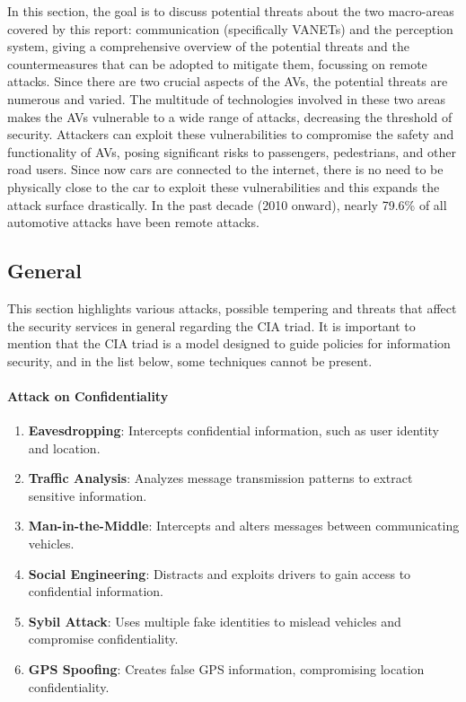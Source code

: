In this section, the goal is to discuss potential threats about the two macro-areas covered by this report:
communication (specifically VANETs) and the perception system,
giving a comprehensive overview of the potential threats and the
countermeasures that can be adopted to mitigate them, focussing on remote attacks.
Since there are two crucial aspects of the AVs, the potential threats are numerous and varied.
The multitude of technologies involved in these two areas makes the AVs vulnerable to a wide range of attacks,
decreasing the threshold of security.
Attackers can exploit these vulnerabilities to compromise the safety and functionality of AVs, posing significant risks to passengers, pedestrians, and other road users.
Since now cars are connected to the internet, there is no need to be physically close to the car to exploit these vulnerabilities and this expands the attack surface drastically.
In the past decade (2010 onward), nearly 79.6\% of all automotive attacks have been
remote attacks\cite{cybersec}.

\subsection{General}\label{subsec:communication-system}

This section highlights various attacks, possible tempering and threats that affect the security services in general regarding
the CIA triad.
It is important to mention that the CIA triad is a model designed to guide policies for information security, and in the list below, some techniques cannot be present.

\paragraph{Attack on Confidentiality}
\begin{enumerate}
    \item \textbf{Eavesdropping}: Intercepts confidential information, such as user identity and location.
    \item \textbf{Traffic Analysis}: Analyzes message transmission patterns to extract sensitive information.
    \item \textbf{Man-in-the-Middle}: Intercepts and alters messages between communicating vehicles.
    \item \textbf{Social Engineering}: Distracts and exploits drivers to gain access to confidential information.
    \item \textbf{Sybil Attack}: Uses multiple fake identities to mislead vehicles and compromise confidentiality.
    \item \textbf{GPS Spoofing}: Creates false GPS information, compromising location confidentiality.
\end{enumerate}

